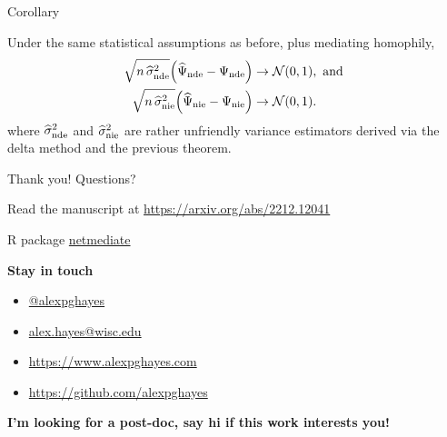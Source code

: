 \documentclass{beamer}
\theoremstyle{remark}
\begin{document}
\begin{frame}{Corollary}

    \begin{theorem}

        \vspace{2mm}

        Under the same statistical assumptions as before, plus mediating homophily,
        \begin{align*}
            \sqrt{n \, \sigmahatnde} \paren*{\ndehat - \nde}
             & \to
            \Normal{0}{1}, \text { and } \\
            \sqrt{n \, \sigmahatnie} \paren*{\niehat - \nie}
             & \to
            \Normal{0}{1}.
        \end{align*}
        \noindent where $\widehat{\sigma}^2_\mathrm{nde}$ and $\widehat{\sigma}^2_\mathrm{nie}$ are rather unfriendly variance estimators derived via the delta method and the previous theorem.

    \end{theorem}

\end{frame}






\begin{frame}{Thank you! Questions?}

    Read the manuscript at \url{https://arxiv.org/abs/2212.12041}

    R package \href{https://github.com/alexpghayes/netmediate}{netmediate}

    \textbf{Stay in touch}

    \begin{itemize}
        \item[]  \href{https://twitter.com/alexpghayes}{@alexpghayes}
        \item[]  \href{mailto:alex.hayes@wisc.edu}{alex.hayes@wisc.edu}
        \item[]  \url{https://www.alexpghayes.com} %
        \item[]  \url{https://github.com/alexpghayes}
    \end{itemize}

    \textbf{I'm looking for a post-doc, say hi if this work interests you!}
\end{frame}
\end{document}
